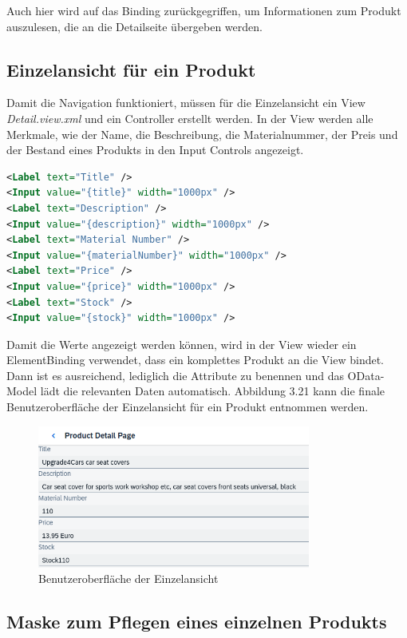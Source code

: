 Auch hier wird auf das Binding zurückgegriffen, um Informationen zum Produkt auszulesen, die an die Detailseite übergeben werden.

\subsection{Einzelansicht für ein Produkt}
Damit die Navigation funktioniert, müssen für die Einzelansicht ein View \textit{Detail.view.xml} und ein Controller erstellt werden. In der View werden alle Merkmale, wie der Name, die Beschreibung, die Materialnummer, der Preis und der Bestand eines Produkts in den Input Controls angezeigt.
\begin{lstlisting}[language=XML, caption=Auszüge aus der View \texttt{Detail.view.xml}]
<Label text="Title" />    		
<Input value="{title}" width="1000px" />
<Label text="Description" /> 		
<Input value="{description}" width="1000px" />
<Label text="Material Number" />	
<Input value="{materialNumber}" width="1000px" />
<Label text="Price" />			
<Input value="{price}" width="1000px" />
<Label text="Stock" />		
<Input value="{stock}" width="1000px" />
\end{lstlisting}
Damit die Werte angezeigt werden können, wird in der View wieder ein ElementBinding verwendet, dass ein komplettes Produkt an die View bindet. Dann ist es ausreichend, lediglich die Attribute zu benennen und das OData-Model lädt die relevanten Daten automatisch. Abbildung 3.21 kann die finale Benutzeroberfläche der Einzelansicht für ein Produkt entnommen werden.
\begin{figure}[htbp]
 \centering
 \includegraphics[width=0.8\textwidth]{Bilder/ui5 freestyle/3_21_Einzelansicht.png}
 \caption{Benutzeroberfläche der Einzelansicht}
\end{figure}

\subsection{Maske zum Pflegen eines einzelnen Produkts}

